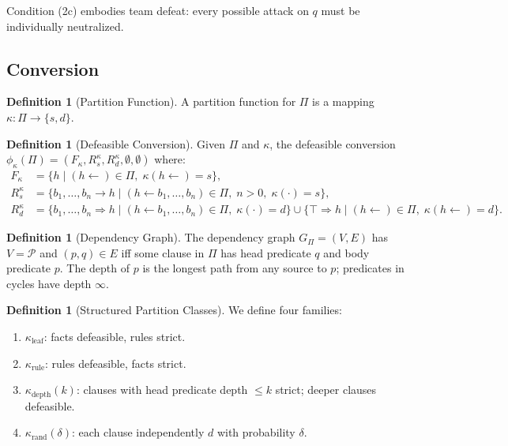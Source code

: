 \documentclass{article}
\theoremstyle{definition}
\newtheorem{definition}[theorem]{Definition}
\newcommand{\Rs}{R_s}
\newcommand{\Rd}{R_d}
\newcommand{\partfunc}{\kappa}
\newcommand{\defto}{\Rightarrow}
\newcommand{\strictto}{\rightarrow}
\begin{document}
Condition (2c) embodies team defeat: every possible attack on $q$ must be individually neutralized.

\subsection{Conversion}

\begin{definition}[Partition Function]\label{def:partition}
A partition function for $\Pi$ is a mapping $\partfunc: \Pi \to \{s, d\}$.
\end{definition}

\begin{definition}[Defeasible Conversion]\label{def:conversion}
Given $\Pi$ and $\partfunc$, the defeasible conversion $\phi_\partfunc(\Pi) = (F_\partfunc, \Rs^{\partfunc}, \Rd^{\partfunc}, \emptyset, \emptyset)$ where:
\begin{align*}
    F_\partfunc &= \{h \mid (h \leftarrow) \in \Pi,\; \partfunc(h \leftarrow) = s\}, \\
    \Rs^{\partfunc} &= \{b_1, \ldots, b_n \strictto h \mid (h \leftarrow b_1, \ldots, b_n) \in \Pi,\; n > 0,\; \partfunc(\cdot) = s\}, \\
    \Rd^{\partfunc} &= \{b_1, \ldots, b_n \defto h \mid (h \leftarrow b_1, \ldots, b_n) \in \Pi,\; \partfunc(\cdot) = d\}
    \cup \{\top \defto h \mid (h \leftarrow) \in \Pi,\; \partfunc(h \leftarrow) = d\}.
\end{align*}
\end{definition}

\begin{definition}[Dependency Graph]\label{def:depgraph}
The dependency graph $G_\Pi = (V, E)$ has $V = \mathcal{P}$ and $(p, q) \in E$ iff some clause in $\Pi$ has head predicate $q$ and body predicate $p$. The depth of $p$ is the longest path from any source to $p$; predicates in cycles have depth $\infty$.
\end{definition}

\begin{definition}[Structured Partition Classes]\label{def:structpart}
We define four families:
\begin{enumerate}[label=(\roman*),nosep]
    \item $\partfunc_{\mathrm{leaf}}$: facts defeasible, rules strict.
    \item $\partfunc_{\mathrm{rule}}$: rules defeasible, facts strict.
    \item $\partfunc_{\mathrm{depth}}(k)$: clauses with head predicate depth $\leq k$ strict; deeper clauses defeasible.
    \item $\partfunc_{\mathrm{rand}}(\delta)$: each clause independently $d$ with probability $\delta$.
\end{enumerate}
\end{definition}
\end{document}
